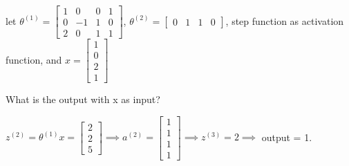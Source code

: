 \begin{example}
    
    let $\theta^{(1)} = \begin{bmatrix}
        1 & 0 & 0 & 1 \\
        0 & -1 & 1 & 0 \\
        2 & 0 & 1 & 1 
    \end{bmatrix}$, $\theta^{(2)} = \begin{bmatrix}
        0 & 1 & 1 & 0 
    \end{bmatrix}$, step function as activation function, and $x = \begin{bmatrix}
        1 \\
        0 \\
        2 \\
        1
    \end{bmatrix}$

    What is the output with x as input?

    $z^{(2)} = \theta^{(1)}x = \begin{bmatrix}
        2 \\ 2 \\ 5
    \end{bmatrix} \implies a^{(2)} = \begin{bmatrix}
        1 \\ 1 \\ 1 \\ 1
    \end{bmatrix} \implies z^{(3)} = 2 \implies$ output = 1. 
\end{example}

